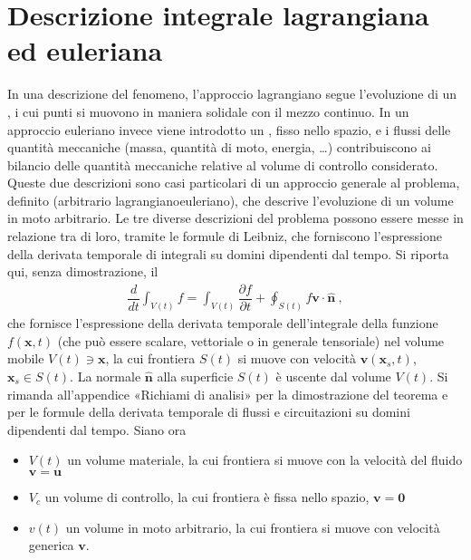 \documentclass[letterpaper,10pt,italian]{jupyterBook}
\begin{document}
\section{Descrizione integrale lagrangiana ed euleriana}
\label{\detokenize{polimi/fluidmechanics-ita/template/capitoli/03_cinematica/12teoria:descrizione-integrale-lagrangiana-ed-euleriana}}\label{\detokenize{polimi/fluidmechanics-ita/template/capitoli/03_cinematica/12teoria:fluid-mechanics-kinematics-integral-lagrange-euler}}
\sphinxAtStartPar
In una descrizione  del fenomeno, l’approccio lagrangiano
segue l’evoluzione di un , i cui punti si muovono in
maniera solidale con il mezzo continuo. In un approccio euleriano invece
viene introdotto un , fisso nello spazio, e i
flussi delle quantità meccaniche (massa, quantità di moto, energia, …)
contribuiscono ai bilancio delle quantità meccaniche relative al volume
di controllo considerato. Queste due descrizioni sono casi particolari
di un approccio generale al problema, definito  (arbitrario
lagrangiano\sphinxhyphen{}euleriano), che descrive l’evoluzione di un volume in moto
arbitrario. Le tre diverse descrizioni del problema possono essere messe
in relazione tra di loro, tramite le formule di Leibniz, che forniscono
l’espressione della derivata temporale di integrali su domini dipendenti
dal tempo. Si riporta qui, senza dimostrazione, il 
\begin{equation*}
\begin{split}\dfrac{d}{d t} \int_{V(t)} f = \int_{V(t)} \dfrac{\partial f}{\partial t} +
  \oint_{S(t)} f\mathbf{v} \cdot \mathbf{\hat{n}} \ ,\end{split}
\end{equation*}
\sphinxAtStartPar
che fornisce l’espressione della derivata temporale dell’integrale della
funzione \(f(\mathbf{x},t)\) (che può essere scalare, vettoriale o in generale
tensoriale) nel volume mobile \(V(t) \ni \mathbf{x}\), la cui frontiera \(S(t)\)
si muove con velocità \(\mathbf{v}(\mathbf{x}_s,t)\), \(\mathbf{x}_s \in S(t)\). La
normale \(\mathbf{\hat{n}}\) alla superficie \(S(t)\) è uscente dal volume
\(V(t)\). Si rimanda all’appendice «Richiami di analisi» per la
dimostrazione del teorema e per le formule della derivata temporale di
flussi e circuitazioni su domini dipendenti dal tempo. Siano ora
\begin{itemize}
\item {} 
\sphinxAtStartPar
\(V(t)\) un volume materiale, la cui frontiera si muove con la
velocità del fluido \(\mathbf{v}=\mathbf{u}\)

\item {} 
\sphinxAtStartPar
\(V_c\) un volume di controllo, la cui frontiera è fissa nello spazio,
\(\mathbf{v}=\mathbf{0}\)

\item {} 
\sphinxAtStartPar
\(v(t)\) un volume in moto arbitrario, la cui frontiera si muove con
velocità generica \(\mathbf{v}\).

\end{itemize}
\end{document}
